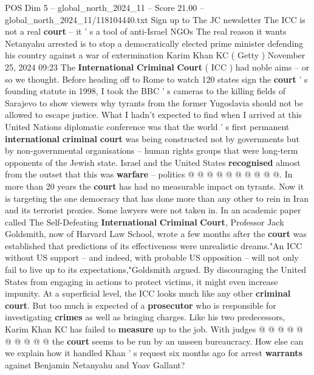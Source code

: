 \begin{textsample}{POS Dim 5 – global\_north\_2024\_11 – Score 21.00 – global\_north\_2024\_11/118104440.txt}  \label{ex:f5_pos_036}
Sign up to The JC newsletter The ICC is not a real \textbf{court} -- it ' s a tool of anti-Israel NGOs The real reason it wants Netanyahu arrested is to stop a democratically elected prime minister defending his country against a war of extermination Karim Khan KC ( Getty ) November 25, 2024 09:23 The \textbf{International} \textbf{Criminal} \textbf{Court} ( ICC ) had noble aims -- or so we thought.
Before heading off to Rome to watch 120 states sign the \textbf{court} ' s founding statute in 1998, I took the BBC ' s cameras to the killing fields of Sarajevo to show viewers why tyrants from the former Yugoslavia should not be allowed to escape justice.
What I hadn't expected to find when I arrived at this United Nations diplomatic conference was that the world ' s first permanent \textbf{international} \textbf{criminal} \textbf{court} was being constructed not by governments but by non-governmental organisations -- human rights groups that were long-term opponents of the Jewish state.
Israel and the United States \textbf{recognised} almost from the outset that this was \textbf{warfare} -- politics @ @ @ @ @ @ @ @ @ @.
In more than 20 years the \textbf{court} has had no measurable impact on tyrants.
Now it is targeting the one democracy that has done more than any other to rein in Iran and its terrorist proxies.
Some lawyers were not taken in.
In an academic paper called The Self-Defeating \textbf{International} \textbf{Criminal} \textbf{Court}, Professor Jack Goldsmith, now of Harvard Law School, wrote a few months after the \textbf{court} was established that predictions of its effectiveness were unrealistic dreams."An ICC without US support -- and indeed, with probable US opposition -- will not only fail to live up to its expectations,"Goldsmith argued.
By discouraging the United States from engaging in actions to protect victims, it might even increase impunity.
At a superficial level, the ICC looks much like any other \textbf{criminal} \textbf{court}.
But too much is expected of a \textbf{prosecutor} who is responsible for investigating \textbf{crimes} as well as bringing charges.
Like his two predecessors, Karim Khan KC has failed to \textbf{measure} up to the job.
With judges @ @ @ @ @ @ @ @ @ @ the \textbf{court} seems to be run by an unseen bureaucracy.
How else can we explain how it handled Khan ' s request six months ago for arrest \textbf{warrants} against Benjamin Netanyahu and Yoav Gallant?

\end{textsample}
